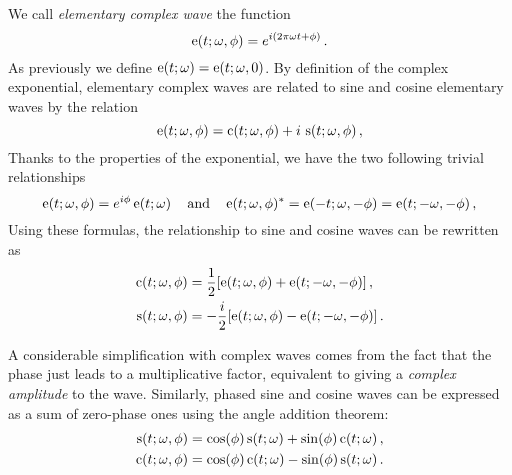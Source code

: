 \begin{definition}
  \label{def:complex-wave}
  We call \emph{elementary complex wave} the function
  \begin{equation}
    \operatorname{e}(t;\omega,\phi)=e^{i(2\pi\omega t + \phi)}\,.
  \end{equation}
  As previously we define $\operatorname{e}(t;\omega)=\operatorname{e}(t;\omega,0)$. By definition of the complex
  exponential, elementary complex waves are related to sine and cosine elementary waves by
  the relation
  \begin{equation}
    \operatorname{e}(t;\omega,\phi)=\operatorname{c}(t;\omega,\phi)+i\,\operatorname{s}(t;\omega,\phi)\,,
  \end{equation}
  Thanks to the properties of the exponential, we have the two following trivial
  relationships
  \begin{equation}
    \operatorname{e}(t;\omega,\phi)=e^{i\phi}\operatorname{e}(t;\omega)\,\quad\text{and}\quad
    \operatorname{e}(t;\omega,\phi)^*=\operatorname{e}(-t;\omega,-\phi)=\operatorname{e}(t;-\omega,-\phi)\,,\label{eq:cw-conj}
  \end{equation}
  Using these formulas, the relationship to sine and cosine waves can be rewritten as
  \begin{align}
    \operatorname{c}(t;\omega,\phi)&=\frac{1}{2}[\operatorname{e}(t;\omega,\phi)+\operatorname{e}(t;-\omega,-\phi)]\,,
    \label{eq:cwtoew}\\
    \operatorname{s}(t;\omega,\phi)&=-\frac{i}{2}[\operatorname{e}(t;\omega,\phi)-\operatorname{e}(t;-\omega,-\phi)]\,.
    \label{eq:swtoew}
  \end{align}
\end{definition}
A considerable simplification with complex waves comes from the fact that the phase just
leads to a multiplicative factor, equivalent to giving a \emph{complex amplitude} to the
wave. Similarly, phased sine and cosine waves can be expressed as a sum of zero-phase ones
using the angle addition theorem:
\begin{align}
  \operatorname{s}(t;\omega,\phi)&=\cos(\phi)\operatorname{s}(t;\omega)+\sin(\phi)\operatorname{c}(t;\omega)\,,\\
  \operatorname{c}(t;\omega,\phi)&=\cos(\phi)\operatorname{c}(t;\omega)-\sin(\phi)\operatorname{s}(t;\omega)\,.
\end{align}
